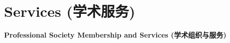 \documentclass[paper=a4,fontsize=11pt]{scrartcl}
\begin{document}









\section*{Services (学术服务)}

\textbf{Professional Society Membership and Services (学术组织与服务)} 
\end{document}
